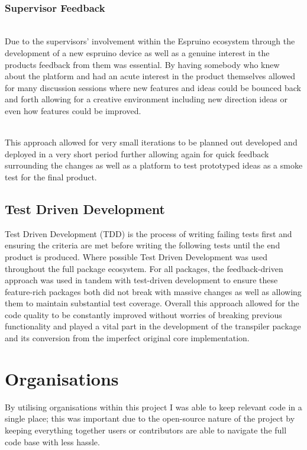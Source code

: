 \documentclass{l4proj}
\begin{document}
\text \\
\subsubsection{Supervisor Feedback}\hfill\\
Due to the supervisors' involvement within the Espruino ecosystem through the development of a new espruino device as well as a genuine interest in the products feedback from them was essential. By having somebody who knew about the platform and had an acute interest in the product themselves allowed for many discussion sessions where new features and ideas could be bounced back and forth allowing for a creative environment including new direction ideas or even how features could be improved.

\text \\

This approach allowed for very small iterations to be planned out developed and deployed in a very short period further allowing again for quick feedback surrounding the changes as well as a platform to test prototyped ideas as a smoke test for the final product.


\subsection{Test Driven Development}

Test Driven Development (TDD) is the process of writing failing tests first and ensuring the criteria are met before writing the following tests until the end product is produced. Where possible Test Driven Development was used throughout the full package ecosystem. For all packages, the feedback-driven approach was used in tandem with test-driven development to ensure these feature-rich packages both did not break with massive changes as well as allowing them to maintain substantial test coverage. Overall this approach allowed for the code quality to be constantly improved without worries of breaking previous functionality and played a vital part in the development of the transpiler package and its conversion from the imperfect original core implementation.

\section{Organisations}

By utilising organisations within this project I was able to keep relevant code in a single place; this was important due to the open-source nature of the project by keeping everything together users or contributors are able to navigate the full code base with less hassle.
\end{document}
